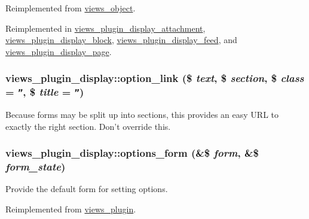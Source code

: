 Reimplemented from \hyperlink{classviews__object_b0753d0001c8c9ff98beee696b4516ba}{views\_\-object}.

Reimplemented in \hyperlink{classviews__plugin__display__attachment_fd104a6bde92eab82cd1a8e1b654179f}{views\_\-plugin\_\-display\_\-attachment}, \hyperlink{classviews__plugin__display__block_aa7cd040bd224b13bb6cada38451b26b}{views\_\-plugin\_\-display\_\-block}, \hyperlink{classviews__plugin__display__feed_9f737ab801100dafa8f1020c0737b598}{views\_\-plugin\_\-display\_\-feed}, and \hyperlink{classviews__plugin__display__page_19b25a55cb43755a944d1f37c0180ff4}{views\_\-plugin\_\-display\_\-page}.\hypertarget{classviews__plugin__display_56c8b43b4f8605d40c23b7e573a185e0}{
\subsubsection[{option\_\-link}]{\setlength{\rightskip}{0pt plus 5cm}views\_\-plugin\_\-display::option\_\-link (\$ {\em text}, \/  \$ {\em section}, \/  \$ {\em class} = {\tt ''}, \/  \$ {\em title} = {\tt ''})}}
\label{classviews__plugin__display_56c8b43b4f8605d40c23b7e573a185e0}


Because forms may be split up into sections, this provides an easy URL to exactly the right section. Don't override this. \hypertarget{classviews__plugin__display_d9c69d91ea1165ff51dcd1f1f6d3a154}{
\subsubsection[{options\_\-form}]{\setlength{\rightskip}{0pt plus 5cm}views\_\-plugin\_\-display::options\_\-form (\&\$ {\em form}, \/  \&\$ {\em form\_\-state})}}
\label{classviews__plugin__display_d9c69d91ea1165ff51dcd1f1f6d3a154}


Provide the default form for setting options. 

Reimplemented from \hyperlink{classviews__plugin_1aaed8da1afd9f45293a37358c159837}{views\_\-plugin}.

